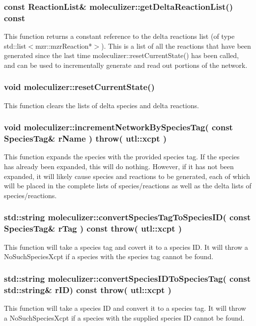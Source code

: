 \subsubsection{const ReactionList\&
  moleculizer::getDeltaReactionList() const}
This function returns a constant reference to the delta reactions list
(of type std::list$<$mzr::mzrReaction*$>$).  This is a list of all the
reactions that have been generated since the last time
moleculizer::resetCurrentState() has been called, and can be used to
incrementally generate and read out portions of the network.

\subsubsection{void moleculizer::resetCurrentState()}
This function clears the lists of delta species and delta reactions.


\subsubsection{void moleculizer::incrementNetworkBySpeciesTag( const
  SpeciesTag\& rName ) throw( utl::xcpt )}
This function expands the species with the provided species tag.  If
the species has already been expanded, this will do nothing.  However,
if it has not been expanded, it will likely cause species and
reactions to be generated, each of which will be placed in the
complete lists of species/reactions as well as the delta lists of
species/reactions. 

\subsubsection{std::string moleculizer::convertSpeciesTagToSpeciesID(
  const SpeciesTag\& rTag ) const throw( utl::xcpt )}

This function will take a species tag and covert it to a species ID.
It will throw a NoSuchSpeciesXcpt if a species with the species tag
cannot be found.


\subsubsection{std::string moleculizer::convertSpeciesIDToSpeciesTag(
  const std::string\& rID) const throw( utl::xcpt )}

This function will take a species ID and convert it to a species tag.
It will throw a NoSuchSpeciesXcpt if a species with the supplied
species ID cannot be found.

